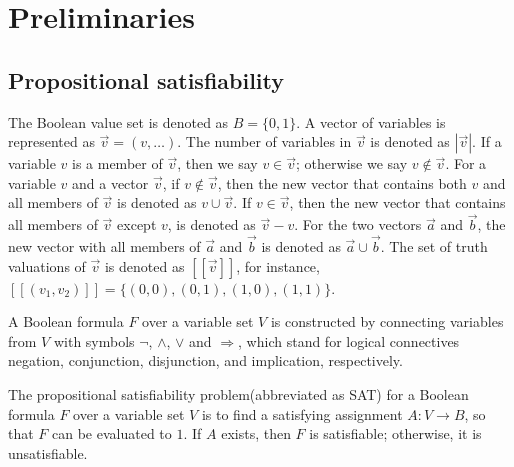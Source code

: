 \documentclass[runningheads,a4paper]{llncs}
\begin{document}
\section{Preliminaries}\label{sec_prem}




\subsection{Propositional satisfiability}\label{subsec_SAT}
The Boolean value set is denoted as $B=\{0,1\}$.
A vector of variables is represented as $\vec{v}=(v,\dots)$.
The number of variables in $\vec{v}$ is denoted as $|\vec{v}|$.
If a variable $v$ is a member of $\vec{v}$,
then we say $v\in\vec{v}$;
otherwise we say $v\notin\vec{v}$.
For a variable $v$ and a vector $\vec{v}$,
if $v\notin\vec{v}$,
then the new vector that contains both $v$ and all members of $\vec{v}$ is denoted as $v\cup\vec{v}$.
If $v\in \vec{v}$,
then the new vector that contains all members of $\vec{v}$ except $v$,
is denoted as $\vec{v}-v$.
For the two vectors $\vec{a}$ and $\vec{b}$,
the new vector with all members of $\vec{a}$ and $\vec{b}$ is denoted as $\vec{a}\cup\vec{b}$.
The set of truth valuations of $\vec{v}$ is denoted as $[\![\vec{v}]\!]$,
for instance,
$[\![(v_1,v_2)]\!]=\{(0,0),(0,1),(1,0),(1,1)\}$.

A Boolean formula $F$ over a variable set $V$ is constructed by connecting variables from $V$ 
with symbols $\neg$, $\wedge$, $\vee$ and $\Rightarrow$,
which stand for logical connectives negation, conjunction, disjunction, and implication, respectively.

The propositional satisfiability problem(abbreviated as SAT) for a Boolean formula $F$ over a variable set $V$ 
is to find a satisfying assignment $A:V\to B$,
so that $F$ can be evaluated to $1$.
If $A$ exists, then $F$ is satisfiable;
otherwise,
it is unsatisfiable.

 
\end{document}
